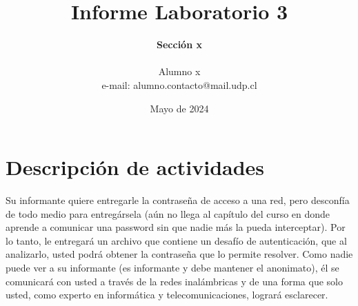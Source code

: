 \documentclass[letter,12pt]{article}
\begin{document}
%
   \title{\Huge{Informe Laboratorio 3}}

   \author{\textbf{Sección x} \\  \\Alumno x \\ e-mail: alumno.contacto@mail.udp.cl}
          
   \date{Mayo de 2024}

   \maketitle
   
   \tableofcontents
 
  \newpage
  

\section{Descripción de actividades}
Su informante quiere entregarle la contraseña de acceso a una red, pero desconfía de todo medio para entregársela (aún no llega al capítulo del curso en donde aprende a comunicar una password sin que nadie más la pueda interceptar).
Por lo tanto, le entregará un archivo que contiene un desafío de autenticación, que al analizarlo, usted podrá obtener la contraseña que lo permite resolver.
Como nadie puede ver a su informante (es informante y debe mantener el anonimato), él se comunicará con usted a través de la redes inalámbricas y de una forma que solo usted, como experto en informática y telecomunicaciones, logrará esclarecer.
\end{document}
